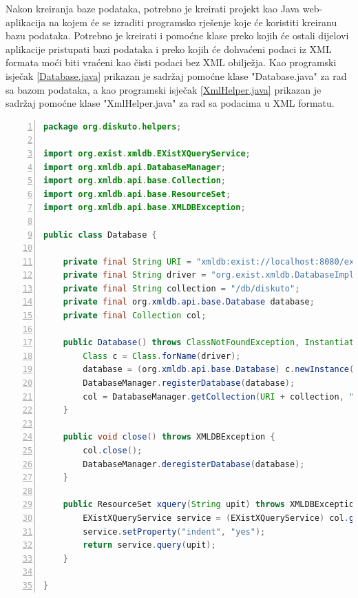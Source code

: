 \documentclass{foi}
\begin{document}
Nakon kreiranja baze podataka, potrebno je kreirati projekt kao Java web-aplikacija na kojem će se izraditi programsko rješenje koje će koristiti kreiranu bazu podataka. Potrebno je kreirati i pomoćne klase preko kojih će ostali dijelovi aplikacije pristupati bazi podataka i preko kojih će dohvaćeni podaci iz XML formata moći biti vraćeni kao čisti podaci bez XML obilježja. Kao programski isječak \ref{Database.java} prikazan je sadržaj pomoćne klase "Database.java" za rad sa bazom podataka, a kao programski isječak \ref{XmlHelper.java} prikazan je sadržaj pomoćne klase "XmlHelper.java" za rad sa podacima u XML formatu.

\begin{lstlisting}[language=Java, numbers=left, caption=Sadržaj pomoćne klase "Database.java", captionpos=b, label={Database.java}]
package org.diskuto.helpers;

import org.exist.xmldb.EXistXQueryService;
import org.xmldb.api.DatabaseManager;
import org.xmldb.api.base.Collection;
import org.xmldb.api.base.ResourceSet;
import org.xmldb.api.base.XMLDBException;

public class Database {

    private final String URI = "xmldb:exist://localhost:8080/exist/xmlrpc";
    private final String driver = "org.exist.xmldb.DatabaseImpl";
    private final String collection = "/db/diskuto";
    private final org.xmldb.api.base.Database database;
    private final Collection col;

    public Database() throws ClassNotFoundException, InstantiationException, IllegalAccessException, XMLDBException {
        Class c = Class.forName(driver);
        database = (org.xmldb.api.base.Database) c.newInstance();
        DatabaseManager.registerDatabase(database);
        col = DatabaseManager.getCollection(URI + collection, "admin", "");
    }

    public void close() throws XMLDBException {
        col.close();
        DatabaseManager.deregisterDatabase(database);
    }

    public ResourceSet xquery(String upit) throws XMLDBException {
        EXistXQueryService service = (EXistXQueryService) col.getService("XQueryService", "1.0");
        service.setProperty("indent", "yes");
        return service.query(upit);
    }

}
\end{lstlisting}
\end{document}
